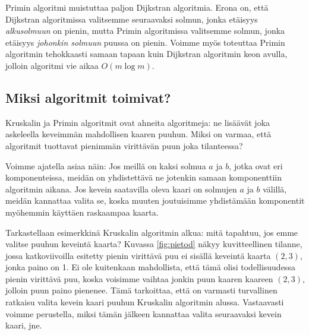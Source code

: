 Primin algoritmi muistuttaa paljon Dijkstran algoritmia.
Erona on, että Dijkstran algoritmissa valitsemme
seuraavaksi solmun, jonka etäisyys \emph{alkusolmuun} on pienin,
mutta Primin algoritmissa valitsemme solmun, jonka etäisyys
\emph{johonkin solmuun} puussa on pienin.
Voimme myös toteuttaa Primin algoritmin tehokkaasti samaan
tapaan kuin Dijkstran algoritmin keon avulla,
jolloin algoritmi vie aikaa $O(m \log m)$.

\subsection{Miksi algoritmit toimivat?}

Kruskalin ja Primin algoritmit ovat ahneita algoritmeja:
ne lisäävät joka askeleella keveimmän mahdollisen kaaren puuhun.
Miksi on varmaa, että algoritmit tuottavat pienimmän virittävän
puun joka tilanteessa?

Voimme ajatella asiaa näin: 
Jos meillä on kaksi solmua $a$ ja $b$, jotka ovat eri komponenteissa,
meidän on yhdistettävä ne jotenkin samaan komponenttiin algoritmin aikana.
Jos kevein saatavilla oleva kaari on solmujen $a$ ja $b$ välillä,
meidän kannattaa valita se, koska muuten joutuisimme yhdistämään komponentit
myöhemmin käyttäen raskaampaa kaarta.

Tarkastellaan esimerkkinä Kruskalin algoritmin alkua:
mitä tapahtuu, jos emme valitse puuhun keveintä kaarta?
Kuvassa \ref{fig:pietod} näkyy kuvitteellinen tilanne,
jossa katkoviivoilla esitetty pienin virittävä puu ei sisällä
keveintä kaarta $(2,3)$, jonka paino on 1.
Ei ole kuitenkaan mahdollista, että tämä olisi todellisuudessa
pienin virittävä puu, koska voisimme vaihtaa jonkin puun kaaren
kaareen $(2,3)$, jolloin puun paino pienenee.
Tämä tarkoittaa, että on varmasti turvallinen ratkaisu valita
kevein kaari puuhun Kruskalin algoritmin alussa.
Vastaavasti voimme perustella, miksi tämän jälkeen kannattaa
valita seuraavaksi kevein kaari, jne.

